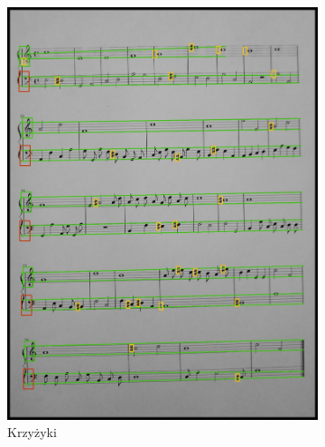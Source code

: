 \documentclass[12pt]{article}
\begin{document}
\begin{figure}[h!]
\begin{subfigure}[b]{0.32\linewidth}
				\includegraphics[width=\linewidth]{zdj/step_4.jpg}
				\caption{Krzyżyki}
			\end{subfigure}
			\begin{subfigure}[b]{0.32\linewidth}

\end{subfigure}
\end{figure}
\end{document}
